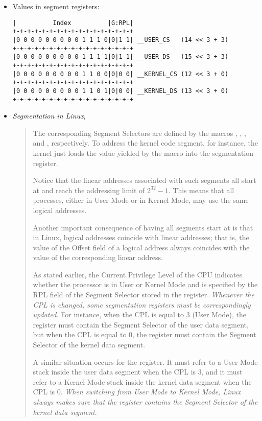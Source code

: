 \begin{itemize}
\item Values in segment registers:
\begin{verbatim}
|          Index          |G:RPL|
+-+-+-+-+-+-+-+-+-+-+-+-+-+-+-+-+
|0 0 0 0 0 0 0 0 0 1 1 1 0|0|1 1| __USER_CS   (14 << 3 + 3)
+-+-+-+-+-+-+-+-+-+-+-+-+-+-+-+-+
|0 0 0 0 0 0 0 0 0 1 1 1 1|0|1 1| __USER_DS   (15 << 3 + 3)
+-+-+-+-+-+-+-+-+-+-+-+-+-+-+-+-+
|0 0 0 0 0 0 0 0 0 1 1 0 0|0|0 0| __KERNEL_CS (12 << 3 + 0)
+-+-+-+-+-+-+-+-+-+-+-+-+-+-+-+-+
|0 0 0 0 0 0 0 0 0 1 1 0 1|0|0 0| __KERNEL_DS (13 << 3 + 0)
+-+-+-+-+-+-+-+-+-+-+-+-+-+-+-+-+
\end{verbatim}
\item \emph{Segmentation in Linux}, \cite[Sec 2.3]{bovet2005understanding}
  \begin{quote}
    The corresponding Segment Selectors are defined by the macros ,
    , , and ,
    respectively. To address the kernel code segment, for instance, the kernel just loads
    the value yielded by the  macro into the  segmentation
    register.

    Notice that the linear addresses associated with such segments all start at 
    and reach the addressing limit of $2^{32}-1$. This means that all processes, either in
    User Mode or in Kernel Mode, may use the same logical addresses.

    Another important consequence of having all segments start at  is
    that in Linux, logical addresses coincide with linear addresses; that is, the value of
    the Offset field of a logical address always coincides with the value of the
    corresponding linear address.

    As stated earlier, the Current Privilege Level of the CPU indicates whether the
    processor is in User or Kernel Mode and is specified by the RPL field of the Segment
    Selector stored in the  register. \emph{Whenever the CPL is changed, some
      segmentation registers must be correspondingly updated.} For instance, when the CPL
    is equal to 3 (User Mode), the  register must contain the Segment Selector of
    the user data segment, but when the CPL is equal to 0, the  register must
    contain the Segment Selector of the kernel data segment.

    A similar situation occurs for the  register. It must refer to a User Mode
    stack inside the user data segment when the CPL is 3, and it must refer to a Kernel
    Mode stack inside the kernel data segment when the CPL is 0. \emph{When switching from
      User Mode to Kernel Mode, Linux always makes sure that the  register
      contains the Segment Selector of the kernel data segment}.


\end{quote}
\end{itemize}
